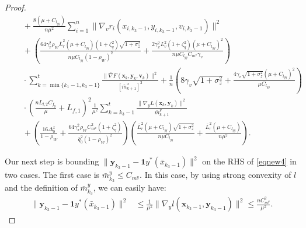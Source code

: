 \documentclass{article}
\theoremstyle{plain}
\theoremstyle{definition}
\theoremstyle{remark}
\begin{document}
\begin{proof}
\begin{align}
&\quad+ \frac{8(\mu + C_{l_{yy}})}{n\mu^2}\sum_{i=1}^n \|\nabla_v r_i(x_{i,k_3-1}, y_{i,k_3-1}, v_{i,k_3-1})\|^2 \nonumber\\
&\quad+ \left(\frac{64 \gamma_x^2 \rho_W \bar{L}_r^2(\mu + C_{l_{yy}})(1 + \zeta_q^2)\sqrt{1+\sigma_z^2}}{n\mu C_{l_{yy}}(1 - \rho_W)^2} + \frac{2\gamma_x^2L_v^2(1+\zeta_q^2)(\mu + C_{l_{yy}})^2}{n\mu C_{l_{yy}}C_{m^v}\gamma_v}\right)\nonumber\\
&\quad\cdot\sum_{k=\min\{k_1-1,k_3-1\}}^{t}  
 \frac{\| \bar{\nabla} F(\mathbf{x}_{k},\mathbf{y}_{k},\mathbf{v}_{k})\|^2}{[\bar{m}^x_{k+1}]^2}+ \frac{1}{n}\left(8\gamma_v\sqrt{1+\sigma_z^2}+\frac{4\gamma_v\sqrt{1+\sigma_z^2}(\mu + C_{l_{yy}})^2}{\mu C_{l_{yy}}} \right)\nonumber\\
&\quad \cdot\left(\frac{nL_{l,2}C_{f_y}}{\mu}+L_{f,1}\right)^2 \frac{1}{\mu^2}\sum_{k=k_3-1}^t\frac{\|\nabla_y L(\mathbf{x}_k,\mathbf{y}_k)\|^2}{\bar{m}_{k+1}^y}\nonumber\\
&\quad +\left(\frac{16\Delta_0^x}{1-\rho_W}+\frac{64\gamma_x^2\rho_WC_{m^x}^2(1+\zeta_q^2)}{\bar{q}_0^2(1-\rho_W)^2}\right)\left(\frac{ \bar{L}_r^2(\mu + C_{l_{yy}})\sqrt{1+\sigma_z^2}}{n\mu C_{l_{yy}}}+\frac{\bar{L}_r^2(\mu+C_{l_{yy}})}{n\mu^2}\right).\label{eqnew4}
\end{align}

Our next step is bounding $\|\mathbf{y}_{k_3-1}\!-\mathbf{1}y^*(\bar{x}_{k_3-1})\|^2$ on the RHS of \cref{eqnew4} in two cases. The first case is $\bar{m}^y_{k_3} \leq C_{m^y}$. In this case, by using strong convexity of $l$ and the definition of $\bar{m}^y_{k_3}$, we can easily have:
\begin{align}
\|\mathbf{y}_{k_3-1}\!-\mathbf{1}y^*(\bar{x}_{k_3-1})\|^2 &\leq
\frac{1}{\mu^2} \|\nabla_y l(\mathbf{x}_{k_3-1}, \mathbf{y}_{k_3-1})\|^2 \leq \frac{nC_{m^y}^2}{\mu^2}.\label{eq77}
\end{align}


\end{proof}
\end{document}
